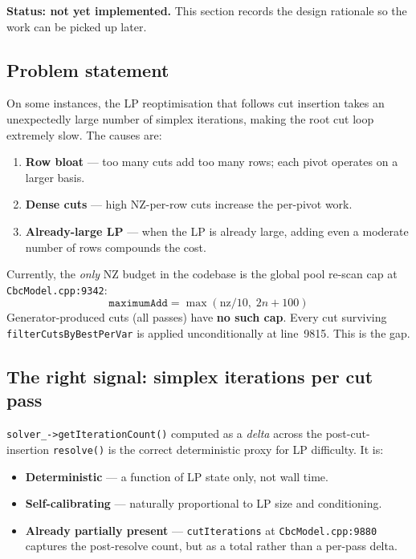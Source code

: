 \documentclass[11pt,a4paper]{article}
\begin{document}
\textbf{Status: not yet implemented.}  This section records the
design rationale so the work can be picked up later.

\subsection*{Problem statement}

On some instances, the LP reoptimisation that follows cut insertion
takes an unexpectedly large number of simplex iterations, making the
root cut loop extremely slow.  The causes are:
\begin{enumerate}[leftmargin=*]
  \item \textbf{Row bloat} --- too many cuts add too many rows; each
        pivot operates on a larger basis.
  \item \textbf{Dense cuts} --- high NZ-per-row cuts increase the
        per-pivot work.
  \item \textbf{Already-large LP} --- when the LP is already large,
        adding even a moderate number of rows compounds the cost.
\end{enumerate}

Currently, the \emph{only} NZ budget in the codebase is the global
pool re-scan cap at \texttt{CbcModel.cpp:9342}:
\[
  \texttt{maximumAdd} = \max(\text{nz}/10,\;2n+100)
\]
Generator-produced cuts (all passes) have \textbf{no such cap}.
Every cut surviving \texttt{filterCutsByBestPerVar} is applied
unconditionally at line~9815.  This is the gap.

\subsection*{The right signal: simplex iterations per cut pass}

\texttt{solver\_->getIterationCount()} computed as a \emph{delta}
across the post-cut-insertion \texttt{resolve()} is the correct
deterministic proxy for LP difficulty.  It is:
\begin{itemize}[leftmargin=*]
  \item \textbf{Deterministic} --- a function of LP state only, not
        wall time.
  \item \textbf{Self-calibrating} --- naturally proportional to LP
        size and conditioning.
  \item \textbf{Already partially present} --- \texttt{cutIterations}
        at \texttt{CbcModel.cpp:9880} captures the post-resolve count,
        but as a total rather than a per-pass delta.
\end{itemize}
\end{document}
